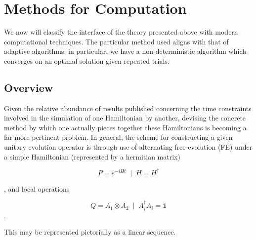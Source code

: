 \documentclass[11pt,twocolumn]{article}
\begin{document}

	\section{Methods for Computation}

	We now will classify the interface of the theory presented above with modern computational techniques. The particular method used aligns with that of adaptive algorithms: in particular, we have a non-deterministic algorithm which converges on an optimal solution given repeated trials. 


	\subsection{Overview}

	Given the relative abundance of results published concerning the time constraints involved in the simulation of one Hamiltonian by another, devising the concrete method by which one actually pieces together these Hamiltonians is becoming a far more pertinent problem. In general, the scheme for constructing a given unitary evolution operator is through use of alternating free-evolution (FE) under a simple Hamiltonian (represented by a hermitian matrix)

	\begin{equation}
	P = e^{-i H t} \;\;\biggr\vert\;\; H = H^{\dagger}
	\end{equation}

	, and local operations

	\begin{equation}
	Q = A_1 \otimes A_2 \;\;\biggr\vert\;\; A_i^{\dagger}A_i = \mathds{1}
	\end{equation}.

	This may be represented pictorially as a linear sequence.
\end{document}
